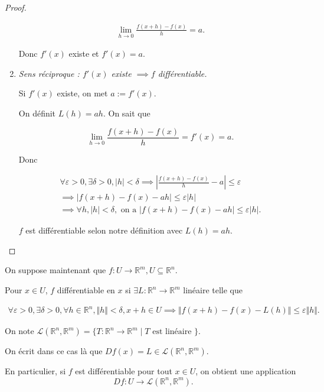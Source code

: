 \documentclass[french]{article}
\theoremstyle{definition}
\newcommand{\lesss}{<}
\newcommand{\less}{\lesss}
\newcommand{\biggg}{>}
\newcommand{\bg}{\biggg}
\begin{document}
\begin{proof}
\begin{enumerate}
    \begin{gather*}
      \lim_{h \to 0} \frac{f(x+h)-f(x)}{h} = a.
    \end{gather*}

    Donc $f'(x)$ existe et $f'(x) = a$.

    \item \emph{Sens réciproque : $f'(x)$ existe $\implies f$ différentiable.}

    Si $f'(x)$ existe, on met $a :=f'(x)$.

    On définit $L(h) =ah$. On sait que

    $$ \lim_{h \to 0} \frac{f(x+h)-f(x)}{h} = f'(x) = a.$$

    Donc

    \begin{gather*}
      \forall \varepsilon \bg 0, \exists \delta  \bg 0, \lvert h \rvert \less \delta \implies \left\lvert \frac{f(x+h)-f(x)}{h} -a \right\rvert \leq \varepsilon  \\
      \implies \lvert f(x+h) -f(x) -ah \rvert \leq \varepsilon \lvert h \rvert \\
      \implies \forall h, \lvert h \rvert \less \delta, \text{ on a } \lvert f(x+h) - f(x) -ah \rvert \leq \varepsilon \lvert h \rvert.
    \end{gather*}

    $f$ est différentiable selon notre définition avec $L(h) =ah$.
  \end{enumerate}
\end{proof}


On suppose maintenant que $f:U \to \mathbb{R}^m, U \subseteq \mathbb{R}^n$.

Pour $x \in U$, $f$ différentiable en $x$ si $\exists L : \mathbb{R}^n \to \mathbb{R}^m$ linéaire telle que

\begin{gather*}
  \forall \varepsilon  \bg 0, \exists \delta  \bg 0, \forall h \in \mathbb{R}^n, \Vert h \Vert \less \delta, x+h \in U \implies \Vert f(x+h) -f(x)-L(h) \Vert \leq \varepsilon \Vert h \Vert.
\end{gather*}

On note $\mathscr{L}(\mathbb{R}^n, \mathbb{R}^m) = \{  T: \mathbb{R}^n \to \mathbb{R}^m \mid T \text{ est linéaire }   \} $.

On écrit dans ce cas là que $Df(x) = L \in \mathscr{L}(\mathbb{R}^n, \mathbb{R}^m)  $.

En particulier, si $f$ est différentiable pour tout $x \in U$, on obtient une application $$Df : U \to \mathscr{L}(\mathbb{R}^n, \mathbb{R}^m). $$
\end{document}
